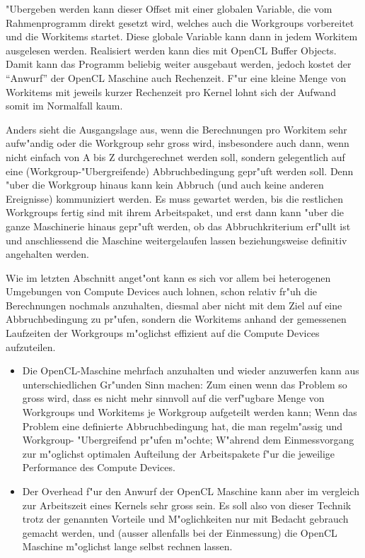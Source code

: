 \begin{refsection}
"Ubergeben werden kann dieser Offset mit einer globalen Variable, die vom
Rahmenprogramm direkt gesetzt wird, welches auch die Workgroups vorbereitet 
und die Workitems startet. Diese globale Variable kann dann in jedem Workitem
ausgelesen werden. Realisiert werden kann dies mit OpenCL Buffer Objects.
Damit kann das Programm beliebig weiter ausgebaut
werden, jedoch kostet der ``Anwurf'' der OpenCL Maschine auch Rechenzeit.
F"ur eine kleine Menge von Workitems mit jeweils kurzer Rechenzeit pro Kernel
lohnt sich der Aufwand somit im Normalfall kaum. 

Anders sieht die 
Ausgangslage aus, wenn die Berechnungen pro Workitem sehr aufw"andig oder
die Workgroup sehr gross wird, insbesondere auch dann, wenn nicht einfach von 
A bis Z durchgerechnet werden soll, sondern gelegentlich auf eine 
(Workgroup-"Ubergreifende) Abbruchbedingung gepr"uft werden soll. Denn
"uber die Workgroup hinaus kann kein Abbruch (und auch keine anderen 
Ereignisse) kommuniziert werden. Es muss gewartet werden, bis die restlichen
Workgroups fertig sind mit ihrem Arbeitspaket, und erst dann kann "uber
die ganze Maschinerie hinaus gepr"uft werden, ob das Abbruchkriterium
erf"ullt ist und anschliessend die Maschine weitergelaufen lassen 
beziehungsweise definitiv angehalten werden.

Wie im letzten Abschnitt anget"ont kann es sich vor allem bei heterogenen 
Umgebungen von Compute Devices auch lohnen, schon relativ fr"uh die 
Berechnungen nochmals anzuhalten, diesmal aber nicht mit dem Ziel auf eine
Abbruchbedingung zu pr"ufen, sondern die Workitems anhand der gemessenen
Laufzeiten der Workgroups m"oglichst effizient auf die Compute Devices
aufzuteilen.

\begin{itemize}
 \item Die OpenCL-Maschine mehrfach anzuhalten und wieder anzuwerfen 
       kann aus unterschiedlichen Gr"unden Sinn machen: Zum einen
       wenn das Problem so gross wird, dass es nicht mehr sinnvoll auf 
       die verf"ugbare Menge von Workgroups und Workitems je Workgroup
       aufgeteilt werden kann; Wenn das Problem eine definierte 
       Abbruchbedingung hat, die man regelm"assig und Workgroup-
       "Ubergreifend pr"ufen m"ochte; W"ahrend dem Einmessvorgang
       zur m"oglichst optimalen Aufteilung der Arbeitspakete f"ur die 
       jeweilige Performance des Compute Devices.
 \item Der Overhead f"ur den Anwurf der OpenCL Maschine kann aber im 
       vergleich zur Arbeitszeit eines Kernels sehr gross sein. Es soll
       also von dieser Technik trotz der genannten Vorteile und 
       M"oglichkeiten nur mit Bedacht gebrauch gemacht werden, und 
       (ausser allenfalls bei der Einmessung) die OpenCL Maschine
       m"oglichst lange selbst rechnen lassen.
\end{itemize}



\end{refsection}
